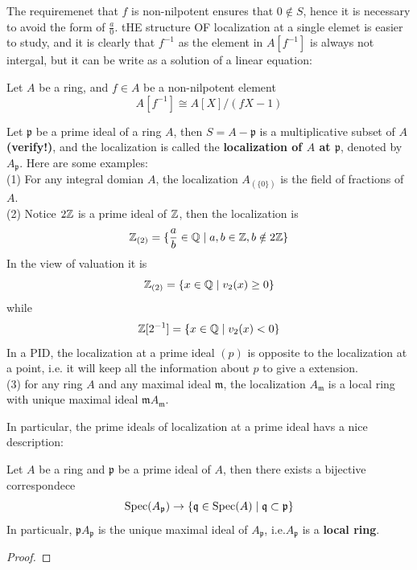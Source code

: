 \documentclass[12pt,a4paper]{article}
\begin{document}
    The requiremenet that \(f\) is non-nilpotent ensures that \(0 \notin S\), hence it is necessary to avoid the form of \(\frac{a}{0}\). tHE structure OF localization at a single elemet is easier to study, and it is clearly that \(f^{-1}\) as the element in \(A[f^{-1}]\) is always not intergal, but it can be write as a solution of a linear equation:
    \begin{lemma}
        Let \(A\) be a ring, and \(f \in A\) be a non-nilpotent element
        \[A[f^{-1}] \cong A[X]/(fX-1)\]
    \end{lemma}

    \begin{example}
        Let \(\mathfrak{p}\) be a prime ideal of a ring \(A\), then \(S = A - \mathfrak{p}\) is a multiplicative subset of \(A\) \textbf{(verify!)}, and the localization is called the \textbf{localization of \(A\) at \(\mathfrak{p}\)}, denoted by \(A_{\mathfrak{p}}\). Here are some examples:\\

        (1) For any integral domian \(A\), the localization \(A_{(\{0\})}\) is the field of fractions of \(A\).\\

        (2) Notice \(2\mathbb{Z}\) is a prime ideal of \(\mathbb{Z}\), then the localization is
        \[\mathbb{Z}_{(2)} = \{\frac{a}{b} \in \mathbb{Q} \mid a,b \in \mathbb{Z}, b \notin 2\mathbb{Z}\} \]
        In the view of valuation it is
        \[\mathbb{Z}_{(2)} = \{x \in \mathbb{Q} \mid v_2(x) \geq 0\}\]
        while
        \[\mathbb{Z}[2^{-1}] = \{x \in \mathbb{Q} \mid v_2(x) < 0 \}\]
        In a PID, the localization at a prime ideal \((p)\) is opposite to the localization at a point, i.e. it will keep all the information about \(p\) to give a extension.\\ 

        (3) for any ring \(A\) and any maximal ideal \(\mathfrak{m}\), the localization \(A_{\mathfrak{m}}\) is a local ring with unique maximal ideal \(\mathfrak{m}A_{\mathfrak{m}}\).\\
    \end{example}

    In particular, the prime ideals of localization at a prime ideal havs a nice description:

    \begin{lemma}
        Let \(A\) be a ring and \(\mathfrak{p}\) be a prime ideal of \(A\), then there exists a bijective correspondece
        \[\operatorname{Spec}(A_{\mathfrak{p}}) \to \{\mathfrak{q} \in \operatorname{Spec}(A) \mid \mathfrak{q} \subset \mathfrak{p}\}\]
        In particualr, \(\mathfrak{p}A_{\mathfrak{p}}\) is the unique maximal ideal of \(A_{\mathfrak{p}}\), i.e.\(A_{\mathfrak{p}}\) is a \textbf{local ring}.
    \end{lemma}
    \begin{proof}
        
    \end{proof}
\end{document}
